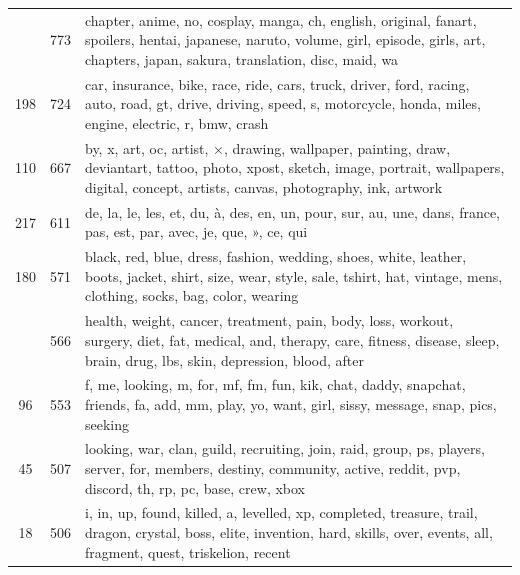 \documentclass[11pt,a4paper,twoside]{article}
\let\oldpb\printbibliography
\renewcommand{\printbibliography}{\oldpb[heading=bibintoc]}
\begin{document}
\begin{longtable}[t]{cr >{\raggedright\arraybackslash}p{}}
\addlinespace
251 & 773 & chapter, anime, no, cosplay, manga, ch, english, original, fanart, spoilers, hentai, japanese, naruto, volume, girl, episode, girls, art, chapters, japan, sakura, translation, disc, maid, wa\\
198 & 724 & car, insurance, bike, race, ride, cars, truck, driver, ford, racing, auto, road, gt, drive, driving, speed, s, motorcycle, honda, miles, engine, electric, r, bmw, crash\\
110 & 667 & by, x, art, oc, artist, ×, drawing, wallpaper, painting, draw, deviantart, tattoo, photo, xpost, sketch, image, portrait, wallpapers, digital, concept, artists, canvas, photography, ink, artwork\\
217 & 611 & de, la, le, les, et, du, à, des, en, un, pour, sur, au, une, dans, france, pas, est, par, avec, je, que, », ce, qui\\
180 & 571 & black, red, blue, dress, fashion, wedding, shoes, white, leather, boots, jacket, shirt, size, wear, style, sale, tshirt, hat, vintage, mens, clothing, socks, bag, color, wearing\\
\addlinespace
195 & 566 & health, weight, cancer, treatment, pain, body, loss, workout, surgery, diet, fat, medical, and, therapy, care, fitness, disease, sleep, brain, drug, lbs, skin, depression, blood, after\\
96 & 553 & f, me, looking, m, for, mf, fm, fun, kik, chat, daddy, snapchat, friends, fa, add, mm, play, yo, want, girl, sissy, message, snap, pics, seeking\\
45 & 507 & looking, war, clan, guild, recruiting, join, raid, group, ps, players, server, for, members, destiny, community, active, reddit, pvp, discord, th, rp, pc, base, crew, xbox\\
18 & 506 & i, in, up, found, killed, a, levelled, xp, completed, treasure, trail, dragon, crystal, boss, elite, invention, hard, skills, over, events, all, fragment, quest, triskelion, recent\\
\bottomrule
\end{longtable}

\cleardoublepage

\printbibliography
\end{document}
